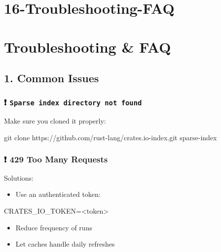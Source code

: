 \documentclass[
  letterpaper,
  DIV=11,
  numbers=noendperiod]{scrreprt}
\newenvironment{Shaded}{\begin{snugshade}}{\end{snugshade}}
\newcommand{\FunctionTok}[1]{\textcolor[rgb]{0.28,0.35,0.67}{#1}}
\newcommand{\NormalTok}[1]{\textcolor[rgb]{0.00,0.23,0.31}{#1}}
\newcommand{\OperatorTok}[1]{\textcolor[rgb]{0.37,0.37,0.37}{#1}}
\newcommand{\VariableTok}[1]{\textcolor[rgb]{0.07,0.07,0.07}{#1}}
\providecommand{\tightlist}{%
  \setlength{\itemsep}{0pt}\setlength{\parskip}{0pt}}
\begin{document}
\chapter{16-Troubleshooting-FAQ}\label{troubleshooting-faq}

\chapter{Troubleshooting \& FAQ}\label{troubleshooting-faq-1}

\section{1. Common Issues}\label{common-issues}

\subsection{\texorpdfstring{❗
\texttt{Sparse\ index\ directory\ not\ found}}{❗ Sparse index directory not found}}\label{sparse-index-directory-not-found}

Make sure you cloned it properly:

\begin{Shaded}
\begin{Highlighting}[]
\FunctionTok{git}\NormalTok{ clone https://github.com/rust{-}lang/crates.io{-}index.git sparse{-}index}
\end{Highlighting}
\end{Shaded}

\subsection{❗ 429 Too Many Requests}\label{too-many-requests}

Solutions:

\begin{itemize}
\tightlist
\item
  Use an authenticated token:
\end{itemize}

\begin{Shaded}
\begin{Highlighting}[]
\VariableTok{CRATES\_IO\_TOKEN}\OperatorTok{=\textless{}}\NormalTok{token}\OperatorTok{\textgreater{}}
\end{Highlighting}
\end{Shaded}

\begin{itemize}
\tightlist
\item
  Reduce frequency of runs
\item
  Let caches handle daily refreshes
\end{itemize}
\end{document}
